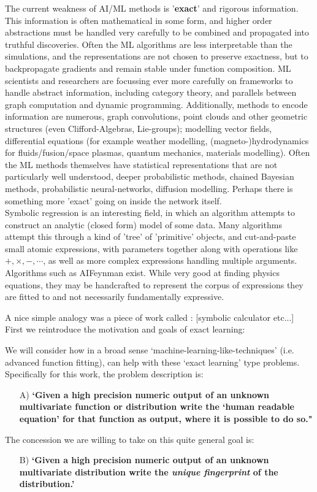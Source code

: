 \documentclass{article}
\begin{document}
The current weakness of AI/ML methods is '\textbf{exact}' and rigorous information. This information is often mathematical in some form, and higher order abstractions must be handled very carefully to be combined and propagated into truthful discoveries. Often the ML algorithms are less interpretable than the simulations, and the representations are not chosen to preserve exactness, but to backpropagate gradients and remain stable under function composition. ML scientists and researchers are focussing ever more carefully on frameworks to handle abstract information, including category theory, and parallels between graph computation and dynamic programming. Additionally, methods to encode information are numerous, graph convolutions, point clouds and other geometric structures (even Clifford-Algebras, Lie-groups); modelling vector fields, differential equations (for example weather modelling, (magneto-)hydrodynamics for fluids/fusion/space plasmas, quantum mechanics, materials modelling). Often the ML methods themselves have statistical representations that are not particularly well understood, deeper probabilistic methods, chained Bayesian methods, probabilistic neural-networks, diffusion modelling. Perhaps there is something more 'exact' going on inside the network itself.  \\

Symbolic regression is an interesting field, in which an algorithm attempts to construct an analytic (closed form) model of some data. Many algorithms attempt this through a kind of 'tree' of 'primitive' objects, and cut-and-paste small atomic expressions, with parameters together along with operations like $+, \times, -, \cdots$, as well as more complex expressions handling multiple arguments. Algorithms such as AIFeynman exist. While very good at finding physics equations, they may be handcrafted to represent the corpus of expressions they are fitted to and not necessarily fundamentally expressive. 

A nice simple analogy was a piece of work called : [symbolic calculator etc...] First we reintroduce the motivation and goals of exact learning:


We will consider how in a broad sense `machine-learning-like-techniques' (i.e. advanced function fitting), can help with these `exact learning' type problems. Specifically for this work, the problem description is: 
\begin{enumerate}
\item[A)] \textbf{`Given a high precision numeric output of an unknown multivariate function or distribution write the `human readable equation' for that function as output, where it is possible to do so."}
\end{enumerate}
The concession we are willing to take on this quite general goal is:
\begin{enumerate}
\item[B)] \textbf{`Given a high precision numeric output of an unknown multivariate distribution write the \emph{unique fingerprint} of the distribution.'}
\end{enumerate}
\end{document}
